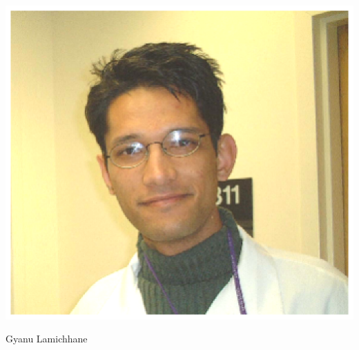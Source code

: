 \documentclass[12pt]{article}
\begin{document}
\begin{center}
\begin{minipage}[t]{3in}
\begin{center}
\includegraphics[scale=0.78]{Figs/gyanu.ps}

Gyanu Lamichhane
\end{center} \end{minipage}
\end{center}
\end{document}
